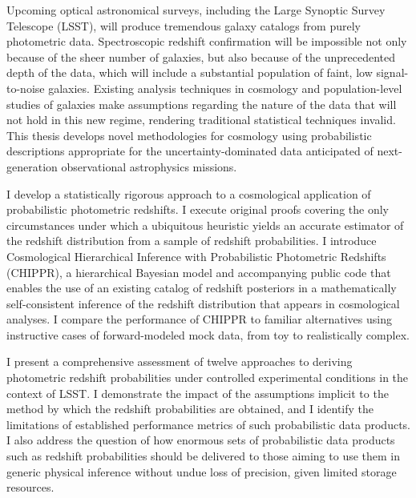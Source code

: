 Upcoming optical astronomical surveys, including the Large Synoptic Survey Telescope (LSST), will produce tremendous galaxy catalogs from purely photometric data.
Spectroscopic redshift confirmation will be impossible not only because of the sheer number of galaxies, but also because of the unprecedented depth of the data, which will include a substantial population of faint, low signal-to-noise galaxies.
Existing analysis techniques in cosmology and population-level studies of galaxies make assumptions regarding the nature of the data that will not hold in this new regime, rendering traditional statistical techniques invalid.
This thesis develops novel methodologies for cosmology using probabilistic descriptions appropriate for the uncertainty-dominated data anticipated of next-generation observational astrophysics missions. 

I develop a statistically rigorous approach to a cosmological application of probabilistic photometric redshifts.
I execute original proofs covering the only circumstances under which a ubiquitous heuristic yields an accurate estimator of the redshift distribution from a sample of redshift probabilities.
I introduce Cosmological Hierarchical Inference with Probabilistic Photometric Redshifts (CHIPPR), a hierarchical Bayesian model and accompanying public code that enables the use of an existing catalog of redshift posteriors in a mathematically self-consistent inference of the redshift distribution that appears in cosmological analyses.
I compare the performance of CHIPPR to familiar alternatives using instructive cases of forward-modeled mock data, from toy to realistically complex.

I present a comprehensive assessment of twelve approaches to deriving photometric redshift probabilities under controlled experimental conditions in the context of LSST.
I demonstrate the impact of the assumptions implicit to the method by which the redshift probabilities are obtained, and I identify the limitations of established performance metrics of such probabilistic data products.
I also address the question of how enormous sets of probabilistic data products such as redshift probabilities should be delivered to those aiming to use them in generic physical inference without undue loss of precision, given limited storage resources.

